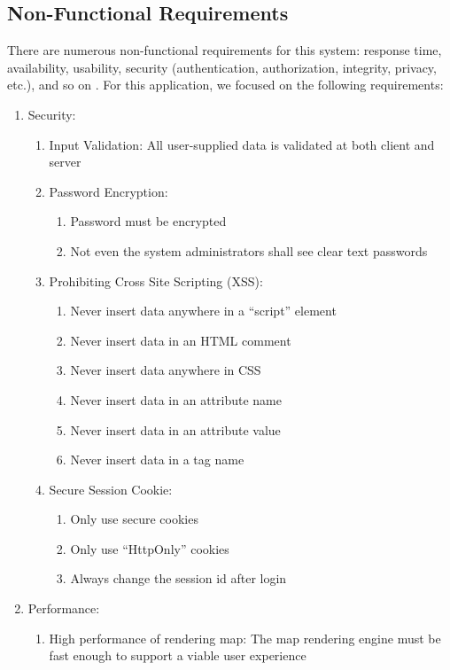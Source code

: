 \subsection{Non-Functional Requirements}
\label{sec:Requirements>Non-Functional Requirements}
There are numerous non-functional requirements for this system: response time, availability, usability, security (authentication, authorization, integrity, privacy, etc.), and so on \cite{web:NonFunc}. For this application, we focused on the following requirements:
\begin{enumerate}
  \item Security:
  \begin{enumerate}
    \item Input Validation: All user-supplied data is validated at both client and server

    \item Password Encryption:
    \begin{enumerate}
      \item Password must be encrypted
      \item Not even the system administrators shall see clear text passwords
    \end{enumerate}

    \item Prohibiting Cross Site Scripting (XSS):
    \begin{enumerate}
      \item Never insert data anywhere in a ``script'' element
      \item Never insert data in an HTML comment
      \item Never insert data anywhere in CSS
      \item Never insert data in an attribute name
      \item Never insert data in an attribute value
      \item Never insert data in a tag name
    \end{enumerate}

    \item Secure Session Cookie:
    \begin{enumerate}
      \item Only use secure cookies
      \item Only use ``HttpOnly'' cookies
      \item Always change the session id after login
    \end{enumerate}
  \end{enumerate}

  \item Performance:
  \begin{enumerate}
    \item High performance of rendering map: The map rendering engine must be fast enough to support a viable user experience
  \end{enumerate}
\end{enumerate}

